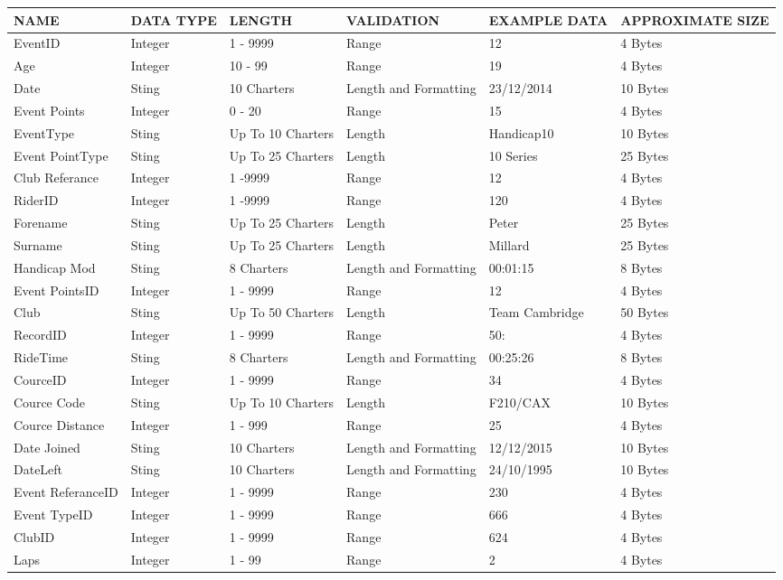 \begin{tabular}{|p{1.5cm}|p{1.5cm}|p{1.8cm}|p{2.1cm}|l|p{2.5cm}|}
	\hline
	NAME & DATA TYPE & LENGTH & VALIDATION & EXAMPLE DATA & APPROXIMATE SIZE \\ \hline
	EventID & Integer & 1 - 9999 & Range & 12 & 4 Bytes \\ \hline
	Age & Integer & 10 - 99  & Range & 19 & 4 Bytes \\ \hline
	Date & Sting & 10 Charters & Length and Formatting & 23/12/2014 & 10 Bytes \\ \hline
	Event Points & Integer & 0 - 20 & Range & 15 & 4 Bytes \\ \hline
	EventType & Sting & Up To 10 Charters & Length & Handicap10 & 10 Bytes \\ \hline
	Event PointType & Sting & Up To 25 Charters & Length & 10 Series & 25 Bytes \\ \hline
	Club Referance & Integer & 1 -9999 & Range & 12 & 4 Bytes \\ \hline
	RiderID & Integer & 1 -9999 & Range & 120 & 4 Bytes \\ \hline
	Forename & Sting & Up To 25 Charters & Length & Peter & 25 Bytes \\ \hline
	Surname & Sting & Up To 25 Charters & Length & Millard & 25 Bytes \\ \hline
	Handicap Mod & Sting & 8 Charters & Length and Formatting & 00:01:15 & 8 Bytes \\ \hline
	Event PointsID & Integer & 1 - 9999 & Range & 12 & 4 Bytes \\ \hline
	Club & Sting & Up To 50 Charters & Length & Team Cambridge & 50 Bytes \\ \hline
	RecordID & Integer & 1 - 9999 & Range & 50: & 4 Bytes \\ \hline
	RideTime & Sting & 8 Charters & Length and Formatting & 00:25:26 & 8 Bytes \\ \hline
	CourceID & Integer & 1 - 9999 & Range & 34 & 4 Bytes \\ \hline
	Cource Code & Sting & Up To 10 Charters & Length & F210/CAX & 10 Bytes \\ \hline
	Cource Distance & Integer & 1 - 999 & Range & 25 & 4 Bytes \\ \hline
	Date Joined & Sting & 10 Charters & Length and Formatting & 12/12/2015 & 10 Bytes \\ \hline
	DateLeft & Sting & 10 Charters & Length and Formatting & 24/10/1995 & 10 Bytes \\ \hline
	Event ReferanceID & Integer & 1 - 9999 & Range & 230 & 4 Bytes \\ \hline
	Event TypeID & Integer & 1 - 9999 & Range & 666 & 4 Bytes \\ \hline
	ClubID & Integer & 1 - 9999 & Range & 624 & 4 Bytes \\ \hline
	Laps & Integer & 1 - 99 & Range & 2 & 4 Bytes \\ \hline
\end{tabular}
